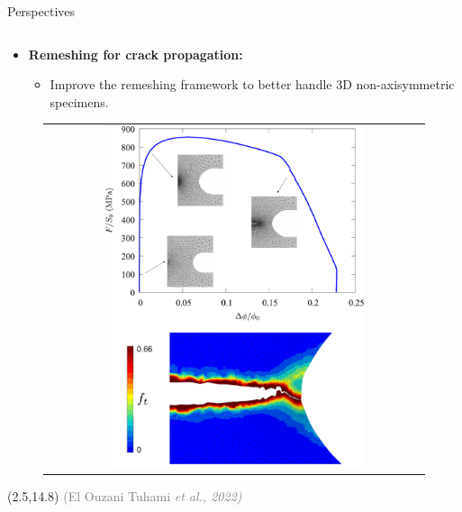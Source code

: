 \documentclass[9pt]{beamer}
\begin{document}

\begin{frame}{Perspectives}

    \begin{columns}

        \begin{column}{0.5\textwidth}
        
        \begin{itemize}
        	\item \textbf{Remeshing for crack propagation:}
        	\vspace{0.15cm}
			\begin{itemize}
				\item Improve the remeshing framework to better handle 3D non-axisymmetric specimens.
			\end{itemize}			        	
        \end{itemize}
        	\begin{figure}
        		\begin{tabular}{c}
            		\includegraphics[width=0.7\textwidth]{Images/remeshing_ST.pdf} \\
        		\end{tabular}
    		\end{figure}
    		
    \begin{textblock}{6}(2.5,14.8)
        \textcolor{gray}{\scriptsize (El Ouzani Tuhami \textit{et al., 2022)}}
   	\end{textblock}
    		

\end{column}
\end{columns}
\end{frame}
\end{document}

